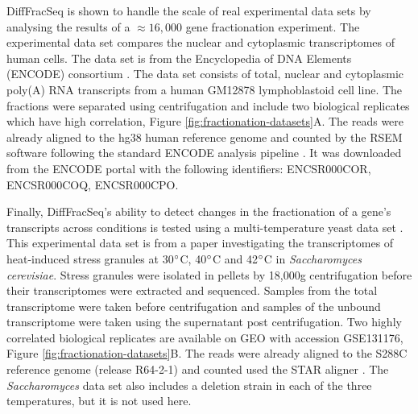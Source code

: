 \documentclass[../main.tex]{subfiles}
\begin{document}
DiffFracSeq is shown to handle the scale of real experimental data sets by analysing the results of a $\approx16,000$ gene fractionation experiment.
The experimental data set compares the nuclear and cytoplasmic transcriptomes of human cells.
The data set is from the Encyclopedia of DNA Elements (ENCODE) consortium  \parencite{Dunham2012}. 
The data set consists of total, nuclear and cytoplasmic poly(A) RNA transcripts from a human GM12878 lymphoblastoid cell line.
The fractions were separated using centrifugation and include two biological replicates which have high correlation, Figure \ref{fig:fractionation-datasets}A.
The reads were already aligned to the hg38 human reference genome and counted by the RSEM software \parencite{Li2011} following the standard ENCODE analysis pipeline \parencite{Luo2020}.
It was downloaded from the ENCODE portal with the following identifiers: ENCSR000COR, ENCSR000COQ, ENCSR000CPO.

Finally, DiffFracSeq's ability to detect changes in the fractionation of a gene's transcripts across conditions is tested using a multi-temperature yeast data set \parencite{Iserman2020}.
This experimental data set is from a paper investigating the transcriptomes of heat-induced stress granules at 30$\degree$C, 40$\degree$C and 42$\degree$C in \textit{Saccharomyces cerevisiae}.
Stress granules were isolated in pellets by 18,000g centrifugation before their transcriptomes were extracted and sequenced.
Samples from the total transcriptome were taken before centrifugation and samples of the unbound transcriptome were taken using the supernatant post centrifugation.
Two highly correlated biological replicates are available on GEO with accession GSE131176, Figure \ref{fig:fractionation-datasets}B.
The reads were already aligned to the S288C reference genome (release R64-2-1) and counted used the STAR aligner \parencite{Dobin2013}.
The \textit{Saccharomyces} data set also includes a deletion strain in each of the three temperatures, but it is not used here. 
\end{document}
